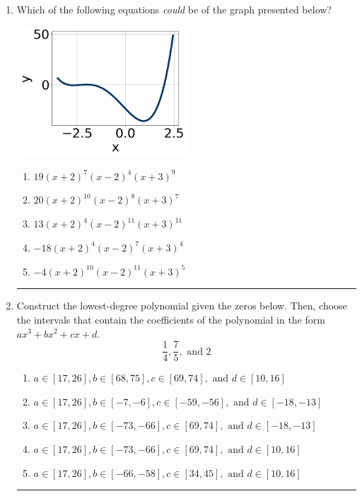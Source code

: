 \documentclass[14pt]{extbook}
\newcommand{\litem}[1]{\item#1\hspace*{-1cm}\rule{\textwidth}{0.4pt}}
\begin{document}
\begin{enumerate}
{\begin{enumerate}[label=\Alph*.]
\end{enumerate} }
\litem{
Which of the following equations \textit{could} be of the graph presented below?
\begin{center}
    \includegraphics[width=0.5\textwidth]{../Figures/polyGraphToFunctionB.png}
\end{center}
\begin{enumerate}[label=\Alph*.]
\item \( 19(x + 2)^{7} (x - 2)^{4} (x + 3)^{9} \)
\item \( 20(x + 2)^{10} (x - 2)^{8} (x + 3)^{7} \)
\item \( 13(x + 2)^{4} (x - 2)^{11} (x + 3)^{11} \)
\item \( -18(x + 2)^{4} (x - 2)^{7} (x + 3)^{4} \)
\item \( -4(x + 2)^{10} (x - 2)^{11} (x + 3)^{5} \)

\end{enumerate} }
\litem{
Construct the lowest-degree polynomial given the zeros below. Then, choose the intervals that contain the coefficients of the polynomial in the form $ax^3+bx^2+cx+d$.\[ \frac{1}{4}, \frac{7}{5}, \text{ and } 2 \]\begin{enumerate}[label=\Alph*.]
\item \( a \in [17, 26], b \in [68, 75], c \in [69, 74], \text{ and } d \in [10, 16] \)
\item \( a \in [17, 26], b \in [-7, -6], c \in [-59, -56], \text{ and } d \in [-18, -13] \)
\item \( a \in [17, 26], b \in [-73, -66], c \in [69, 74], \text{ and } d \in [-18, -13] \)
\item \( a \in [17, 26], b \in [-73, -66], c \in [69, 74], \text{ and } d \in [10, 16] \)
\item \( a \in [17, 26], b \in [-66, -58], c \in [34, 45], \text{ and } d \in [10, 16] \)


\end{enumerate}}
\end{enumerate}
\end{document}
